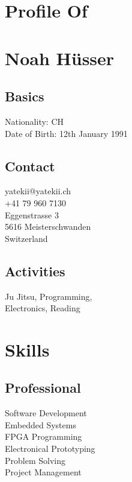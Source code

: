 \documentclass[]{resume}
\begin{document}

\begin{facts}
\section{Profile Of}
\section{Noah Hüsser}
\sectionsep

\subsection{Basics}
Nationality: CH\\
Date of Birth: 12th January 1991
\sectionsep

\subsection{Contact}
yatekii@yatekii.ch\\
+41 79 960 7130\\
\sectionsep
Eggenstrasse 3\\
5616 Meisterschwanden\\
Switzerland
\sectionsep

\subsection{Activities}
Ju Jitsu, Programming,\\
Electronics, Reading
\sectionsep


\section{Skills}

\subsection{Professional}
Software Development\\
Embedded Systems\\
FPGA Programming\\
Electronical Prototyping\\
Problem Solving\\
Project Management
\sectionsep


\end{facts}
\end{document}
